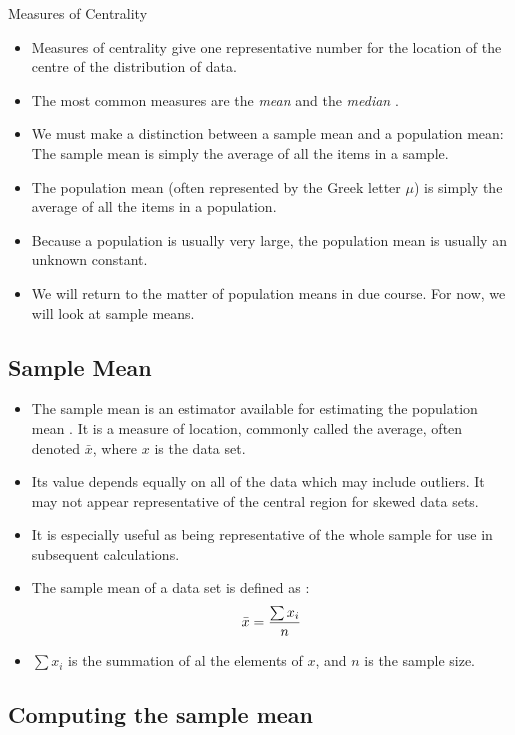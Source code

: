 \documentclass[]{report}
\begin{document}
{
	{Measures of Centrality}

\begin{itemize}
\item Measures of centrality give one representative number for the location of the centre of the distribution of data.
\item
The most common measures are the \t{\emph{mean}} and the \t{\emph{ median }}.
\item We must make a distinction between a sample mean and a population mean: The sample mean is simply the average of all the items in a sample.  \item The population mean (often represented by the Greek letter $\mu$) is simply the average of all the items in a population. \item Because a population is usually very large, the population mean is usually an unknown constant.
\item We will return to the matter of population means in due course. For now, we will look at sample means.
\end{itemize}

}


\subsection{Sample Mean}

\begin{itemize}
\item The sample mean is an estimator available for estimating the population mean . It is a measure of location, commonly called the average, often denoted $\bar{x}$, where $x$ is the data set.
\item
Its value depends equally on all of the data which may include outliers. It may not appear representative of the central region for skewed data sets.
\item
It is especially useful as being representative of the whole sample for use in subsequent calculations.
\item The sample mean of a data set is defined as :
\[ \bar{x} = { \sum x_i\over n}\]
\item $\sum x_i$ is the summation of al the elements of $x$, and $n$ is the sample size.
\end{itemize}

\subsection{Computing the sample mean}
\end{document}

